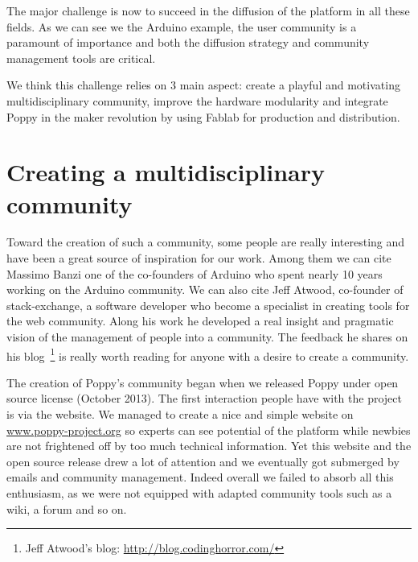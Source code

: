 
The major challenge is now to succeed in the diffusion of the platform in all these fields. As we can see we the Arduino example, the user community is a paramount of importance and both the diffusion strategy and community management tools are critical.

We think this challenge relies on 3 main aspect: create a playful and motivating multidisciplinary community, improve the hardware modularity and integrate Poppy in the maker revolution by using Fablab for production and distribution.



\section{Creating a multidisciplinary community} %
\label{sec:creating_a_multi}

Toward the creation of such a community, some people are really interesting and have been a great source of inspiration for our work. Among them we can cite Massimo Banzi one of the co-founders of Arduino who spent nearly 10 years working on the Arduino community. We can also cite Jeff Atwood, co-founder of stack-exchange, a software developer who become a specialist in creating tools for the web community. Along his work he developed a real insight and pragmatic vision of the management of people into a community. The feedback he shares on his blog~\footnote{Jeff Atwood's blog: \url{http://blog.codinghorror.com/}} is really worth reading for anyone with a desire to create a community.

The creation of Poppy's community began when we released Poppy under open source license (October 2013).
The first interaction people have with the project is via the website. We managed to create a nice and simple website on \url{www.poppy-project.org} so experts can see potential of the platform while newbies are not frightened off by too much technical information.
Yet this website and the open source release drew a lot of attention and we eventually got submerged by emails and community management. Indeed overall  we failed to absorb all this enthusiasm, as we were not equipped with adapted community tools such as a wiki, a forum and so on.

